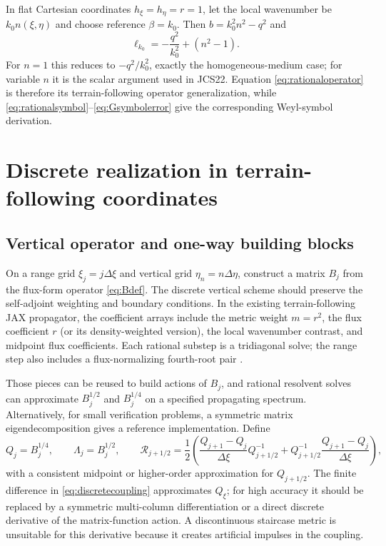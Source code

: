 \documentclass[11pt]{article}
\newcommand{\Rop}{\mathcal R}
\begin{document}
In flat Cartesian coordinates $h_\xi=h_\eta=r=1$, let the local wavenumber
be $k_0n(\xi,\eta)$ and choose reference $\beta=k_0$. Then
$b=k_0^2n^2-q^2$ and
\begin{equation}\label{eq:jcsrecovery}
  \ell_{k_0}=-\frac{q^2}{k_0^2}+(n^2-1).
\end{equation}
For $n=1$ this reduces to $-q^2/k_0^2$, exactly the homogeneous-medium case;
for variable $n$ it is the scalar argument used in JCS22. Equation
\eqref{eq:rationaloperator} is therefore its
terrain-following operator generalization, while
\eqref{eq:rationalsymbol}--\eqref{eq:Gsymbolerror} give the corresponding
Weyl-symbol derivation.

\section{Discrete realization in terrain-following coordinates}

\subsection{Vertical operator and one-way building blocks}

On a range grid $\xi_j=j\Delta\xi$ and vertical grid $\eta_n=n\Delta\eta$,
construct a matrix $B_j$ from the flux-form operator \eqref{eq:Bdef}. The
discrete vertical scheme should preserve the self-adjoint weighting and
boundary conditions. In the existing terrain-following JAX propagator, the
coefficient arrays include the metric weight $m=r^2$, the flux coefficient
$r$ (or its density-weighted version), the local wavenumber contrast, and
midpoint flux coefficients. Each rational substep is a tridiagonal solve;
the range step also includes a flux-normalizing fourth-root pair
\cite{lytaev_tf}.

Those pieces can be reused to build actions of $B_j$, and rational resolvent
solves can approximate $B_j^{1/2}$ and $B_j^{1/4}$ on a specified propagating
spectrum. Alternatively, for small verification problems, a symmetric
matrix eigendecomposition gives a reference implementation. Define
\begin{equation}\label{eq:discretecoupling}
  Q_j=B_j^{1/4},\qquad \Lambda_j=B_j^{1/2},\qquad
  \Rop_{j+1/2}=\frac12\left(
  \frac{Q_{j+1}-Q_j}{\Delta\xi}Q_{j+1/2}^{-1}
  +Q_{j+1/2}^{-1}\frac{Q_{j+1}-Q_j}{\Delta\xi}\right),
\end{equation}
with a consistent midpoint or higher-order approximation for $Q_{j+1/2}$.
The finite difference in \eqref{eq:discretecoupling} approximates $Q_\xi$;
for high accuracy it should be replaced by a symmetric multi-column
differentiation or a direct discrete derivative of the matrix-function
action. A discontinuous staircase metric is unsuitable for this derivative
because it creates artificial impulses in the coupling.
\end{document}
